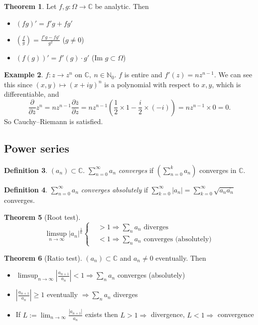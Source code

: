 \documentclass[a4paper]{article}
\theoremstyle{definition}
\newtheorem{defn}{Definition}[subsection]
\newtheorem{thm}[defn]{Theorem}
\newtheorem{example}[defn]{Example}
\begin{document}
\begin{thm}
Let $f,g:\Omega \rightarrow \mathbb C$ be analytic. Then \begin{itemize}
    \item $(fg)'=f'g+fg'$
    \item $\displaystyle \left( \frac{f}{g}\right) = \frac{f'g-fg'}{g^2}$ ($g\neq 0$)
    \item $(f(g))' = f'(g)\cdot g'$ ($\text{Im }g\subset \Omega$)
\end{itemize}
\end{thm}

\begin{example}
$f:z\rightarrow z^n$ on $\mathbb C,\ n\in \mathbb N_0$. $f$ is entire and $f'(z) = n z^{n-1}$. We can see this since $(x,y) \mapsto (x+i y)^n$ is a polynomial with respect to $x,y$, which is differentiable, and
\[
\frac{\partial}{\partial \overline{z}} z^n = n z^{n-1} \frac{\partial\overline{z}}{\partial z} = n z^{n-1} \left(\frac12 \times 1 - \frac{i}{2} \times (-i) \right) = n z^{n-1} \times 0 = 0.
\]
So Cauchy–Riemann is satisfied.
\end{example}
\subsection{Power series}
\begin{defn}
$(a_n) \subset \mathbb C$. $\displaystyle \sum_{n=0}^\infty a_n$ \textit{converges} if $\displaystyle \left( \sum_{n=0}^k a_n \right)$ converges in $\mathbb C$.
\end{defn}
\begin{defn}
$\displaystyle \sum_{n=0}^\infty a_n$ \textit{converges absolutely} if $\displaystyle \sum_{k=0}^\infty |a_n|=\sum_{k=0}^\infty \sqrt{a_n \overline{a_n}}$ converges.
\end{defn}
\begin{thm}[Root test]
\[
\limsup_{n\rightarrow \infty} |a_n|^{\frac1n}\left\{\begin{aligned}
&>1 \Rightarrow \sum_n a_n \text{ diverges} \\
&<1\Rightarrow \sum_n a_n \text{ converges (absolutely)}
\end{aligned} \right.
\]
\end{thm}

\begin{thm}[Ratio test]
$(a_n) \subset \mathbb C$ and $a_n\neq 0$ eventually. Then
\begin{itemize}
    \item $\displaystyle \limsup_{n\rightarrow \infty} \left| \frac{a_{n+1}}{a_n} \right| <1 \Rightarrow \sum_n a_n$ converges (absolutely)
    \item $\displaystyle \left| \frac{a_{n+1}}{a_n} \right| \geq 1$ eventually $\Rightarrow \displaystyle \sum_n a_n$ diverges
    \item If $\displaystyle L:= \lim_{n\rightarrow \infty} \frac{|a_{n+1}|}{a_n}$ exists then $L>1 \Rightarrow$ divergence, $L<1 \Rightarrow$ convergence
\end{itemize}
\end{thm}
\end{document}
